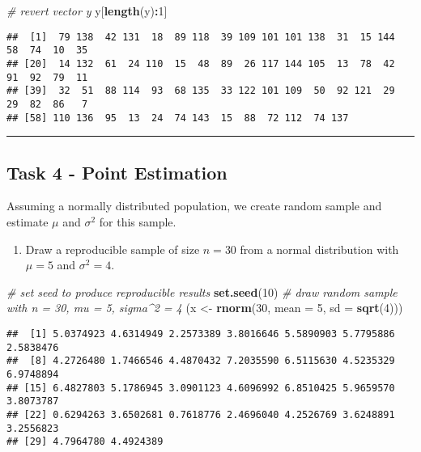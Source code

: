 \documentclass[
]{article}
\newenvironment{Shaded}{\begin{snugshade}}{\end{snugshade}}
\newcommand{\CommentTok}[1]{\textcolor[rgb]{0.56,0.35,0.01}{\textit{#1}}}
\newcommand{\DataTypeTok}[1]{\textcolor[rgb]{0.13,0.29,0.53}{#1}}
\newcommand{\DecValTok}[1]{\textcolor[rgb]{0.00,0.00,0.81}{#1}}
\newcommand{\KeywordTok}[1]{\textcolor[rgb]{0.13,0.29,0.53}{\textbf{#1}}}
\newcommand{\NormalTok}[1]{#1}
\newcommand{\OperatorTok}[1]{\textcolor[rgb]{0.81,0.36,0.00}{\textbf{#1}}}
\newcommand{\StringTok}[1]{\textcolor[rgb]{0.31,0.60,0.02}{#1}}
\providecommand{\tightlist}{%
  \setlength{\itemsep}{0pt}\setlength{\parskip}{0pt}}
\begin{document}
\begin{Shaded}
\begin{Highlighting}[]
\CommentTok{# revert vector y}
\NormalTok{y[}\KeywordTok{length}\NormalTok{(y)}\OperatorTok{:}\DecValTok{1}\NormalTok{]}
\end{Highlighting}
\end{Shaded}

\begin{verbatim}
##  [1]  79 138  42 131  18  89 118  39 109 101 101 138  31  15 144  58  74  10  35
## [20]  14 132  61  24 110  15  48  89  26 117 144 105  13  78  42  91  92  79  11
## [39]  32  51  88 114  93  68 135  33 122 101 109  50  92 121  29  29  82  86   7
## [58] 110 136  95  13  24  74 143  15  88  72 112  74 137
\end{verbatim}

\begin{center}\rule{0.5\linewidth}{0.5pt}\end{center}

\hypertarget{task-4---point-estimation}{%
\subsection{Task 4 - Point Estimation}\label{task-4---point-estimation}}

Assuming a normally distributed population, we create random sample and
estimate \(\mu\) and \(\sigma^{2}\) for this sample.

\begin{enumerate}
\def\labelenumi{\arabic{enumi}.}
\tightlist
\item
  Draw a reproducible sample of size \(n = 30\) from a normal
  distribution with \(\mu=5\) and \(\sigma^{2}=4\).
\end{enumerate}

\begin{Shaded}
\begin{Highlighting}[]
\CommentTok{# set seed to produce reproducible results}
\KeywordTok{set.seed}\NormalTok{(}\DecValTok{10}\NormalTok{)}
\CommentTok{# draw random sample with n = 30, mu = 5, sigma^2 = 4}
\NormalTok{(x <-}\StringTok{ }\KeywordTok{rnorm}\NormalTok{(}\DecValTok{30}\NormalTok{, }\DataTypeTok{mean =} \DecValTok{5}\NormalTok{, }\DataTypeTok{sd =} \KeywordTok{sqrt}\NormalTok{(}\DecValTok{4}\NormalTok{)))}
\end{Highlighting}
\end{Shaded}

\begin{verbatim}
##  [1] 5.0374923 4.6314949 2.2573389 3.8016646 5.5890903 5.7795886 2.5838476
##  [8] 4.2726480 1.7466546 4.4870432 7.2035590 6.5115630 4.5235329 6.9748894
## [15] 6.4827803 5.1786945 3.0901123 4.6096992 6.8510425 5.9659570 3.8073787
## [22] 0.6294263 3.6502681 0.7618776 2.4696040 4.2526769 3.6248891 3.2556823
## [29] 4.7964780 4.4924389
\end{verbatim}
\end{document}
